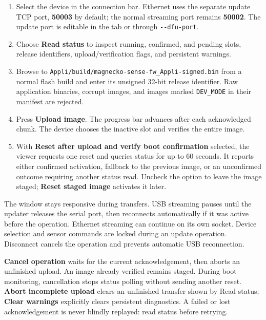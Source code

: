 \documentclass[10pt,a4paper,oneside]{report}
\providecommand{\tightlist}{\setlength{\itemsep}{1pt}\setlength{\parskip}{1pt}}
\begin{document}
\begin{enumerate}
\def\labelenumi{\arabic{enumi}.}
\tightlist
\item
  Select the device in the connection bar. Ethernet uses the separate update TCP port, \textbf{50003} by default; the normal streaming port remains \textbf{50002}. The update port is editable in the tab or through \texttt{-\allowbreak{}-\allowbreak{}dfu-\allowbreak{}port}.
\item
  Choose \textbf{Read status} to inspect running, confirmed, and pending slots, release identifiers, upload/verification flags, and persistent warnings.
\item
  Browse to \texttt{Appli/\allowbreak{}build/\allowbreak{}magnecko-\allowbreak{}sense-\allowbreak{}fw\_\allowbreak{}Appli-\allowbreak{}signed.\allowbreak{}bin} from a normal flash build and enter its unsigned 32-bit release identifier. Raw application binaries, corrupt images, and images marked \texttt{DEV\_\allowbreak{}MODE} in their manifest are rejected.
\item
  Press \textbf{Upload image}. The progress bar advances after each acknowledged chunk. The device chooses the inactive slot and verifies the entire image.
\item
  With \textbf{Reset after upload and verify boot confirmation} selected, the viewer requests one reset and queries status for up to 60 seconds. It reports either confirmed activation, fallback to the previous image, or an unconfirmed outcome requiring another status read. Uncheck the option to leave the image staged; \textbf{Reset staged image} activates it later.
\end{enumerate}

The window stays responsive during transfers. USB streaming pauses until the updater releases the serial port, then reconnects automatically if it was active before the operation. Ethernet streaming can continue on its own socket. Device selection and sensor commands are locked during an update operation. Disconnect cancels the operation and prevents automatic USB reconnection.

\textbf{Cancel operation} waits for the current acknowledgement, then aborts an unfinished upload. An image already verified remains staged. During boot monitoring, cancellation stops status polling without sending another reset. \textbf{Abort incomplete upload} clears an unfinished transfer shown by Read status; \textbf{Clear warnings} explicitly clears persistent diagnostics. A failed or lost acknowledgement is never blindly replayed: read status before retrying.
\end{document}
